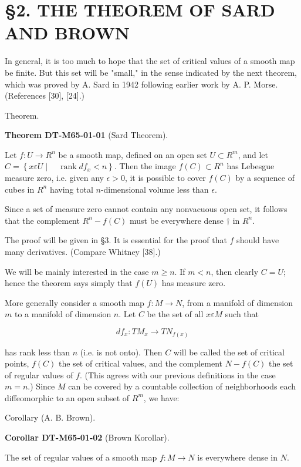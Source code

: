 \documentclass[10pt, letterpaper]{article}
\newcommand{\CustomHeading}[3]{%
  \par\medskip\noindent%
  \textbf{#1 #2} \textnormal{(#3)}.\enskip%
}
\newenvironment{THEO}[2]{\begin{unitbox}\CustomHeading{Theorem}{#1}{#2}}{\end{unitbox}}
\newenvironment{KORO}[2]{\begin{unitbox}\CustomHeading{Corollar}{#1}{#2}}{\end{unitbox}}
\begin{document}
\section*{§2. THE THEOREM OF SARD AND BROWN}
In general, it is too much to hope that the set of critical values of a smooth map be finite. But this set will be "small," in the sense indicated by the next theorem, which was proved by A. Sard in 1942 following earlier work by A. P. Morse. (References [30], [24].)

Theorem. 

\begin{THEO}{DT-M65-01-01}{Sard Theorem}
Let $f: U \rightarrow R^{n}$ be a smooth map, defined on an open set $U \subset R^{m}$, and let
$
C=\left\{x \varepsilon U \mid \quad \operatorname{rank} d f_{x}<n\right\} .
$
Then the image $f(C) \subset R^{n}$ has Lebesgue measure zero, i.e. given any $\epsilon>0$, it is possible to cover $f(C)$ by a sequence of cubes in $R^{n}$ having total $n$-dimensional volume less than $\epsilon$.

Since a set of measure zero cannot contain any nonvacuous open set, it follows that the complement $R^{n}-f(C)$ must be everywhere dense $\dagger$ in $R^{n}$.
\end{THEO}

The proof will be given in §3. It is essential for the proof that $f$ should have many derivatives. (Compare Whitney [38].)

We will be mainly interested in the case $m \geq n$. If $m<n$, then clearly $C=U$; hence the theorem says simply that $f(U)$ has measure zero.

More generally consider a smooth map $f: M \rightarrow N$, from a manifold of dimension $m$ to a manifold of dimension $n$. Let $C$ be the set of all $x \varepsilon M$ such that

$$
d f_{x}: T M_{x} \rightarrow T N_{f(x)}
$$


has rank less than $n$ (i.e. is not onto). Then $C$ will be called the set of critical points, $f(C)$ the set of critical values, and the complement $N-f(C)$ the set of regular values of $f$. (This agrees with our previous definitions in the case $m=n$.) Since $M$ can be covered by a countable collection of neighborhoods each diffeomorphic to an open subset of $R^{m}$, we have:

Corollary (A. B. Brown). 

\begin{KORO}{DT-M65-01-02}{Brown Korollar}
The set of regular values of a smooth map $f: M \rightarrow N$ is everywhere dense in $N$.
\end{KORO}
\end{document}
